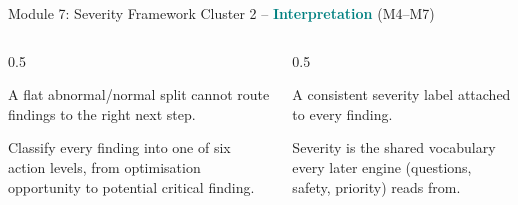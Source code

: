 \documentclass[9pt,aspectratio=169]{beamer}
\begin{document}
\begin{frame}{Module 7: Severity Framework}
\textcolor{black!55}{\scriptsize Cluster 2 -- \textcolor{teal}{\textbf{Interpretation}} (M4--M7)}\\[2pt]
\begin{columns}[T,onlytextwidth]
\begin{column}{0.5\textwidth}
\begin{tcolorbox}[colback=blue!7,colframe=blue!55!black,title=\textbf{Motivation},boxrule=0.6pt,arc=1mm,left=5pt,right=5pt,top=3pt,bottom=3pt,fonttitle=\small]
\footnotesize A flat abnormal/normal split cannot route findings to the right next step.
\end{tcolorbox}
\vspace{5pt}
\begin{tcolorbox}[colback=teal!7,colframe=teal!55!black,title=\textbf{Method},boxrule=0.6pt,arc=1mm,left=5pt,right=5pt,top=3pt,bottom=3pt,fonttitle=\small]
\footnotesize Classify every finding into one of six action levels, from optimisation opportunity to potential critical finding.
\end{tcolorbox}
\end{column}
\begin{column}{0.5\textwidth}
\begin{tcolorbox}[colback=green!8,colframe=green!45!black,title=\textbf{Result},boxrule=0.6pt,arc=1mm,left=5pt,right=5pt,top=3pt,bottom=3pt,fonttitle=\small]
\footnotesize A consistent severity label attached to every finding.
\end{tcolorbox}
\vspace{5pt}
\begin{tcolorbox}[colback=orange!10,colframe=orange!65!black,title=\textbf{Conclusion},boxrule=0.6pt,arc=1mm,left=5pt,right=5pt,top=3pt,bottom=3pt,fonttitle=\small]
\footnotesize Severity is the shared vocabulary every later engine (questions, safety, priority) reads from.
\end{tcolorbox}
\end{column}
\end{columns}
\end{frame}
\end{document}
